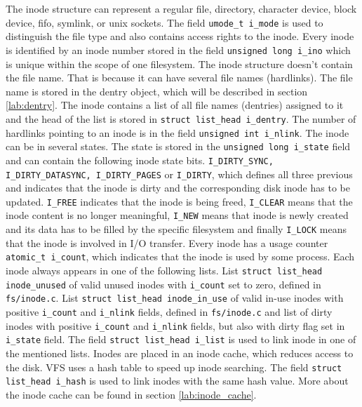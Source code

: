 The inode structure can represent a regular file, directory, character device,
block device, fifo, symlink, or unix sockets. The field \texttt{umode\_t i\_mode} is
used to distinguish the file type and also contains access rights to the inode. Every
inode is identified by an inode number stored in the field \texttt{unsigned long i\_ino}
which is unique within the scope of one filesystem. The inode structure doesn't contain
the file name. That is because it can have several file names (hardlinks). The file name is
stored in the dentry object, which will be described in section
\ref{lab:dentry}. The inode
contains a list of all file names (dentries) assigned to it and the head of the list is
stored in \texttt{struct list\_head i\_dentry}. The number of hardlinks pointing to an
inode is in the field \texttt{unsigned int i\_nlink}. The inode can be in several states.
The state is stored in the \texttt{unsigned long i\_state} field and can contain the following
inode state bits. \texttt{I\_DIRTY\_SYNC, I\_DIRTY\_DATASYNC, I\_DIRTY\_PAGES} or
\texttt{I\_DIRTY}, which defines all three previous and indicates that the inode
is dirty and the corresponding disk inode has to be updated. \texttt{I\_FREE} indicates
that the inode is being freed, \texttt{I\_CLEAR} means that the inode content is no longer
meaningful, \texttt{I\_NEW} means that inode is newly created and its data has to be
filled by the specific filesystem and finally \texttt{I\_LOCK} means that the inode is
involved in I/O transfer. Every inode has a usage counter \texttt{atomic\_t i\_count},
which indicates that the inode is used by some process.
Each inode always appears in one of the following lists. List \texttt{struct
list\_head inode\_unused} of valid unused inodes with \texttt{i\_count} set to zero,
defined in \texttt{fs/inode.c}. List \texttt{struct list\_head inode\_in\_use} of
valid in-use inodes with positive \texttt{i\_count} and \texttt{i\_nlink} fields,
defined in \texttt{fs/inode.c} and list of dirty inodes with positive
\texttt{i\_count} and \texttt{i\_nlink} fields, but also with dirty flag set in
\texttt{i\_state} field. The field \texttt{struct list\_head i\_list} is used to link
inode in one of the mentioned lists. Inodes are placed in an inode cache, which reduces
access to the disk. VFS uses a hash table to speed up inode searching. The field
\texttt{struct list\_head i\_hash} is used to link inodes with the same hash value. More
about the inode cache can be found in section \ref{lab:inode_cache}.

